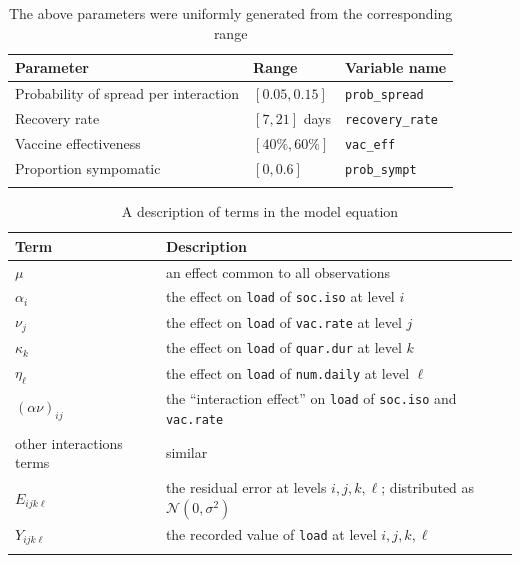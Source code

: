\documentclass[12pt,a4paper]{article}
\begin{document}
\begin{appendices}
\begin{table}[H]
    \centering
    \begin{tabular}{l l l}\hline
         Parameter &  Range & Variable name \\ \hline\hline
         Probability of spread per interaction & $[0.05,0.15]$ & \verb`prob_spread` \\ \hline
         Recovery rate & $[7,21]$ days & \verb`recovery_rate` \\ \hline
         Vaccine effectiveness & $[40\%,60\%]$ & \verb`vac_eff`\\ \hline
         Proportion sympomatic  & $[0, 0.6]$ & \verb`prob_sympt` \\ \hline \\
    \end{tabular}
    \caption{The above parameters were uniformly generated from the corresponding range}
    \label{tab:randomization_summary}
\end{table}

\begin{table}[H]
	\centering
	\begin{tabular}{l l}\hline
	Term & Description \\ \hline \hline
	$\mu$ & an effect common to all observations \\ \hline
	$\alpha_i$ & the effect on \verb`load` of \verb`soc.iso` at level $i$ \\ \hline
 	$\nu_j$ & the effect on \verb`load` of \verb`vac.rate` at level $j$ \\ \hline
	$\kappa_k$ & the effect on \verb`load` of \verb`quar.dur` at level $k$ \\ \hline
	$\eta_\ell$ & the effect on \verb`load` of \verb`num.daily` at level $\ell$ \\ \hline
	$(\alpha\nu)_{ij}$ & the ``interaction effect'' on \verb`load` of \verb`soc.iso` and \verb`vac.rate` \\ \hline
	other interactions terms & similar \\ \hline
	$E_{ijk\ell}$ & the residual error at levels $i,j,k,\ell$; distributed as $\mathcal{N}(0,\sigma^2)$ \\ \hline
	$Y_{ijk\ell}$ & the recorded value of \verb`load` at level $i,j,k,\ell$ \\ \hline \\
	\end{tabular}
	\caption{A description of terms in the model equation}
	\label{tab:model_equation}
\end{table}


\end{appendices}
\end{document}
